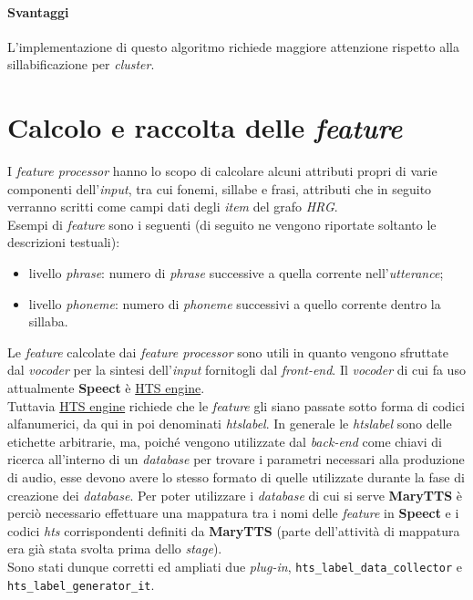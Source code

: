              \paragraph{Svantaggi}
                    L'implementazione di questo algoritmo richiede maggiore attenzione rispetto alla sillabificazione per \textit{cluster}.




\section{Calcolo e raccolta delle \textit{feature}}
I \textit{feature processor} hanno lo scopo di calcolare alcuni attributi propri di varie componenti dell'\textit{input},
tra cui fonemi, sillabe e frasi, attributi che in seguito verranno scritti come campi dati degli \textit{item} del grafo \textit{HRG}. \\
Esempi di \textit{feature} sono i seguenti (di seguito ne vengono riportate soltanto le descrizioni testuali):
\begin{itemize}
  \item livello \textit{phrase}: numero di \textit{phrase} successive a quella corrente nell'\textit{utterance};
  \item livello \textit{phoneme}: {numero di \textit{phoneme} successivi a quello corrente dentro la sillaba}.
\end{itemize}

Le \textit{feature} calcolate dai \textit{feature processor} sono utili in quanto vengono sfruttate dal \textit{vocoder} per
la sintesi dell'\textit{input} fornitogli dal \textit{front-end}. Il \textit{vocoder} di cui fa uso attualmente \textbf{Speect} è 
\href{http://hts-engine.sourceforge.net/}{HTS engine}. \\ 
Tuttavia \href{http://hts-engine.sourceforge.net/}{HTS engine} richiede che le \textit{feature} gli siano passate sotto forma di codici 
alfanumerici, da qui in poi denominati \textit{htslabel}. In generale le \textit{htslabel} sono delle etichette arbitrarie, ma, poiché vengono
utilizzate dal \textit{back-end} come chiavi di ricerca all'interno di un \textit{database} per trovare i parametri necessari alla produzione di audio, 
esse devono avere lo stesso formato di quelle utilizzate durante la fase di creazione dei \textit{database}. Per poter utilizzare i \textit{database} 
di cui si serve \textbf{MaryTTS} è perciò necessario effettuare una mappatura tra i nomi 
delle \textit{feature} in \textbf{Speect} e i codici \textit{hts} corrispondenti definiti da \textbf{MaryTTS} (parte dell’attività di mappatura era 
già stata svolta prima dello \textit{stage}). \\
Sono stati dunque corretti ed ampliati due \textit{plug-in}, \texttt{hts\_label\_data\_collector} e \texttt{hts\_label\_generator\_it}.

